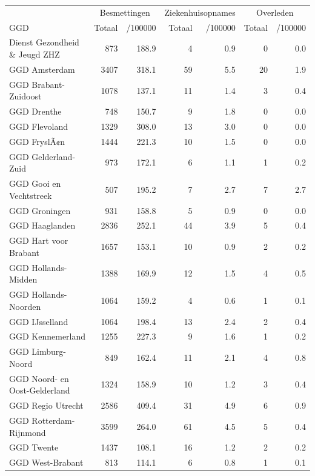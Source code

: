\documentclass[
  english,
  man,floatsintext]{apa6}
\begin{document}
\begin{table}
\centering\begingroup\fontsize{10}{12}\selectfont

\begin{threeparttable}
\begin{tabular}{lrrrrrr}
\toprule
\multicolumn{1}{c}{ } & \multicolumn{2}{c}{Besmettingen} & \multicolumn{2}{c}{Ziekenhuisopnames} & \multicolumn{2}{c}{Overleden} \\
\cmidrule(l{3pt}r{3pt}){2-3} \cmidrule(l{3pt}r{3pt}){4-5} \cmidrule(l{3pt}r{3pt}){6-7}
GGD & Totaal & /100000 & Totaal & /100000 & Totaal & /100000\\
\midrule
Dienst Gezondheid \& Jeugd ZHZ & 873 & 188.9 & 4 & 0.9 & 0 & 0.0\\
GGD Amsterdam & 3407 & 318.1 & 59 & 5.5 & 20 & 1.9\\
GGD Brabant-Zuidoost & 1078 & 137.1 & 11 & 1.4 & 3 & 0.4\\
GGD Drenthe & 748 & 150.7 & 9 & 1.8 & 0 & 0.0\\
GGD Flevoland & 1329 & 308.0 & 13 & 3.0 & 0 & 0.0\\
GGD FryslÃ¢n & 1444 & 221.3 & 10 & 1.5 & 0 & 0.0\\
GGD Gelderland-Zuid & 973 & 172.1 & 6 & 1.1 & 1 & 0.2\\
GGD Gooi en Vechtstreek & 507 & 195.2 & 7 & 2.7 & 7 & 2.7\\
GGD Groningen & 931 & 158.8 & 5 & 0.9 & 0 & 0.0\\
GGD Haaglanden & 2836 & 252.1 & 44 & 3.9 & 5 & 0.4\\
GGD Hart voor Brabant & 1657 & 153.1 & 10 & 0.9 & 2 & 0.2\\
GGD Hollands-Midden & 1388 & 169.9 & 12 & 1.5 & 4 & 0.5\\
GGD Hollands-Noorden & 1064 & 159.2 & 4 & 0.6 & 1 & 0.1\\
GGD IJsselland & 1064 & 198.4 & 13 & 2.4 & 2 & 0.4\\
GGD Kennemerland & 1255 & 227.3 & 9 & 1.6 & 1 & 0.2\\
GGD Limburg-Noord & 849 & 162.4 & 11 & 2.1 & 4 & 0.8\\
GGD Noord- en Oost-Gelderland & 1324 & 158.9 & 10 & 1.2 & 3 & 0.4\\
GGD Regio Utrecht & 2586 & 409.4 & 31 & 4.9 & 6 & 0.9\\
GGD Rotterdam-Rijnmond & 3599 & 264.0 & 61 & 4.5 & 5 & 0.4\\
GGD Twente & 1437 & 108.1 & 16 & 1.2 & 2 & 0.2\\
GGD West-Brabant & 813 & 114.1 & 6 & 0.8 & 1 & 0.1\\

\end{tabular}
\end{threeparttable}
\end{table}
\end{document}
